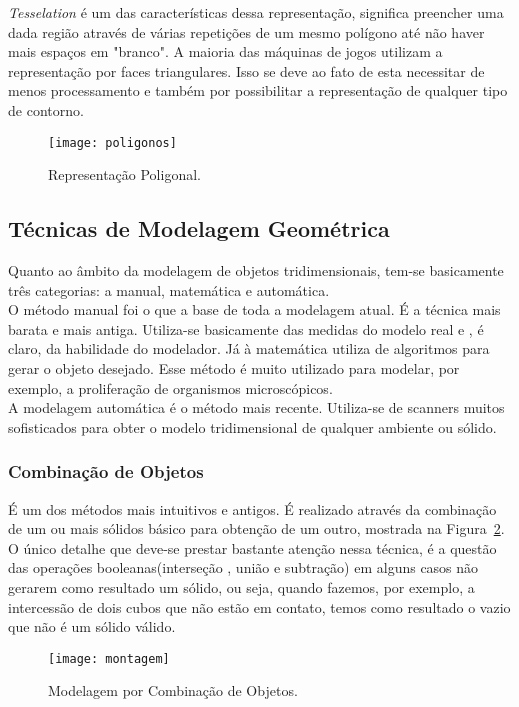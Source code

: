 \textit{Tesselation} é um das características dessa representação, significa preencher uma dada região através de várias repetições de um mesmo polígono até não haver mais espaços em "branco". A maioria das máquinas de jogos utilizam a representação por faces triangulares. Isso se deve ao fato de esta necessitar de menos processamento e também por possibilitar a representação de qualquer tipo de contorno\cite{traina}.

\begin{figure}[ht!]
      \centering
	  \texttt{[image: poligonos]}
	  \caption{Representação Poligonal.}
	  \label{fg:pilogono}
\end{figure} 

\subsection{Técnicas de Modelagem Geométrica}
Quanto ao âmbito da modelagem de objetos tridimensionais, tem-se basicamente três categorias: a manual, matemática e automática. \\

O método manual foi o que a base de toda a modelagem atual. É a técnica mais barata e mais antiga.  Utiliza-se basicamente das medidas do modelo real e , é claro, da habilidade do modelador. Já à matemática utiliza de algoritmos para gerar o objeto desejado. Esse método é muito utilizado para modelar, por exemplo, a proliferação de organismos microscópicos.\\

A modelagem automática é o método mais recente. Utiliza-se de scanners muitos sofisticados para obter o modelo tridimensional de qualquer ambiente ou sólido.

\subsubsection{Combinação de Objetos}
É um dos métodos mais intuitivos e antigos. É realizado através da combinação de um ou mais sólidos básico para obtenção de um outro\cite{hearn}, mostrada na Figura~\ref{fg:comb}. O  único detalhe que deve-se prestar bastante atenção nessa técnica, é a questão das operações booleanas(interseção , união e subtração) em alguns casos não gerarem como resultado um sólido, ou seja, quando fazemos, por exemplo, a intercessão de dois cubos que não estão em contato, temos como resultado o vazio que não é um sólido válido.

\begin{figure}[ht!]
      \centering
	  \texttt{[image: montagem]}
	  \caption{Modelagem por Combinação de Objetos.}
	  \label{fg:comb}
\end{figure} 


